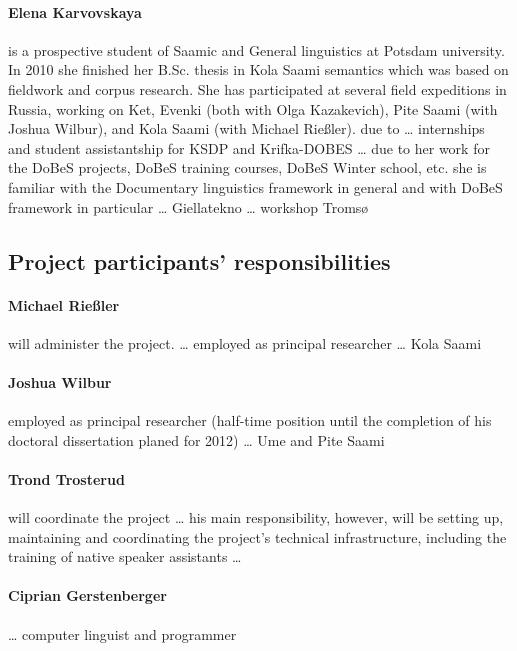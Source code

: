 \documentclass[a4paper,12pt]{article}
\begin{document}
\paragraph{Elena Karvovskaya} is a prospective student of Saamic and General linguistics at Potsdam university. In 2010 she finished her B.Sc. thesis in Kola Saami semantics which was based on fieldwork and corpus research. She has participated at several field expeditions in Russia, working on %
 Ket, Evenki (both with Olga Kazakevich), Pite Saami (with Joshua Wilbur), and Kola Saami (with Michael Rießler). due to  … internships and student assistantship for KSDP and Krifka-DOBES …  due to her work for the DoBeS projects, DoBeS training courses, DoBeS Winter school, etc. she is familiar with the Documentary linguistics framework in general and with DoBeS framework in particular … Giellatekno … workshop Tromsø 

\subsection{Project participants' responsibilities}

\paragraph{Michael Rießler} will administer the project. … employed as principal researcher … Kola Saami 

\paragraph{Joshua Wilbur} employed as principal researcher (half-time position until the completion of his doctoral dissertation planed for 2012) … Ume and Pite Saami 

\paragraph{Trond Trosterud} will coordinate the project … his main responsibility, however, will be setting up, maintaining and coordinating the project's technical infrastructure, including the training of native speaker assistants …

\paragraph{Ciprian Gerstenberger} … computer linguist and programmer
\end{document}
